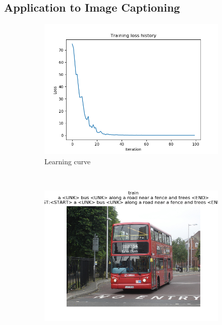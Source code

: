 \documentclass[12pt]{article}
\begin{document}
\subsection{Application to Image Captioning}
\begin{figure}[htbp]
    \centering
    \begin{subfigure}[t]{0.48\textwidth}
        \centering
        \includegraphics[trim={3in 0in 3in 1in},scale=0.7]{./Homework2/output/hw2p5_fig01.png}
        \caption{Learning curve}
    \label{hw2p5a}
    \end{subfigure}\\
    \begin{subfigure}[t]{0.48\textwidth}
        \centering
        \includegraphics[trim={3in 0in 3in 0in},scale=0.5]{./Homework2/output/hw2p5_fig02.png}

\end{subfigure}
\end{figure}
\end{document}
